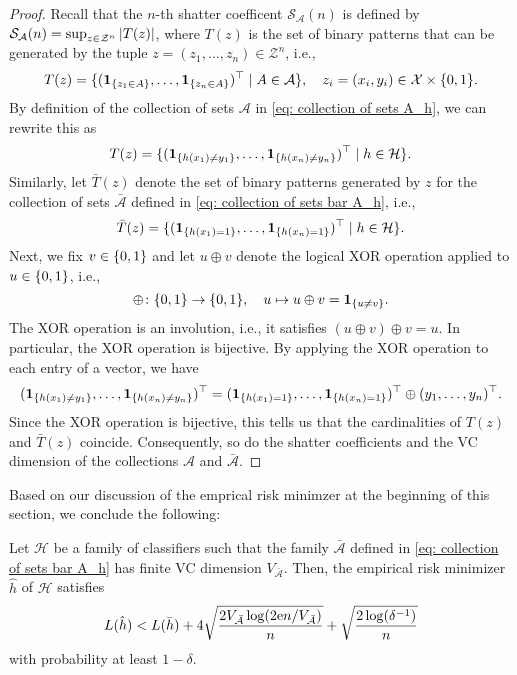 \begin{proof}
Recall that the $n$-th shatter coefficent $\mathcal{S}_{\mathcal{A}}(n)$ is defined by $\mathcal{S}_{\mathcal{A}}(n) = \sup_{z \in \mathcal{Z}^n} \abs{T(z)}$, where $T(z)$ is the set of binary patterns that can be generated by the tuple $z = (z_1, \dots, z_n) \in \mathcal{Z}^n$, i.e.,
\[
    T(z) = \{(\indSet{z_1 \in A}, \dots, \indSet{z_n \in A})^{\top} \with A \in \mathcal{A}\}, \quad z_i = (x_i, y_i) \in \mathcal{X} \times \set{0, 1}.
\]
By definition of the collection of sets $\mathcal{A}$ in \eqref{eq: collection of sets A_h}, we can rewrite this as
\[
    T(z) = \{(\indSet{h(x_1) \neq y_1}, \dots, \indSet{h(x_n) \neq y_n})^{\top} \with h \in \mathcal{H}\}.
\]
Similarly, let $\bar{T}(z)$ denote the set of binary patterns generated by $z$ for the collection of sets $\bar{\mathcal{A}}$ defined in \eqref{eq: collection of sets bar A_h}, i.e.,
\[
    \bar{T}(z) = \{(\indSet{h(x_1) = 1}, \dots, \indSet{h(x_n) = 1})^{\top} \with h \in \mathcal{H}\}.
\]
Next, we fix $v \in \set{0, 1}$ and let $u \oplus v$ denote the logical XOR operation applied to $u \in \set{0, 1}$, i.e.,
\[
    \oplus \colon \set{0, 1} \to \set{0, 1}, \quad u \mapsto u \oplus v = \indSet{u \neq v}.
\]
The XOR operation is an involution, i.e., it satisfies $(u \oplus v) \oplus v = u$. In particular, the XOR operation is bijective. By applying the XOR operation to each entry of a vector, we have
\[
    (\indSet{h(x_1) \neq y_1}, \dots, \indSet{h(x_n) \neq y_n})^{\top} = (\indSet{h(x_1) = 1}, \dots, \indSet{h(x_n) = 1})^{\top} \oplus (y_1, \dots, y_n)^{\top}.
\]
Since the XOR operation is bijective, this tells us that the cardinalities of $T(z)$ and $\bar{T}(z)$ coincide. Consequently, so do the shatter coefficients and the VC dimension of the collections $\mathcal{A}$ and $\bar{\mathcal{A}}$.
\end{proof}

Based on our discussion of the emprical risk minimzer at the beginning of this section, we conclude the following:

\begin{corollary}
Let $\mathcal{H}$ be a family of classifiers such that the family $\bar{\mathcal{A}}$ defined in \eqref{eq: collection of sets bar A_h} has finite VC dimension $V_{\bar{\mathcal{A}}}$. Then, the empirical risk minimizer $\hat{h}$ of $\mathcal{H}$ satisfies
\[
    L(\hat{h}) < L(\bar{h}) + 4 \sqrt{\frac{2 V_{\bar{\mathcal{A}}} \log(2 \mathrm{e} n / V_{\bar{\mathcal{A}}})}{n}} + \sqrt{\frac{2 \log(\delta^{-1})}{n}}
\]
with probability at least $1 - \delta$.
\end{corollary}
